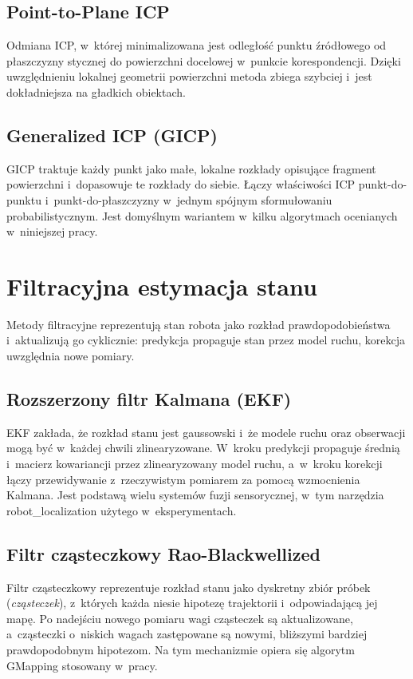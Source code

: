 \subsection{Point-to-Plane ICP}

Odmiana ICP, w~której minimalizowana jest odległość punktu źródłowego
od płaszczyzny stycznej do powierzchni docelowej w~punkcie korespondencji.
Dzięki uwzględnieniu lokalnej geometrii powierzchni metoda zbiega szybciej
i~jest dokładniejsza na gładkich obiektach.

\subsection{Generalized ICP (GICP)}

GICP traktuje każdy punkt jako małe, lokalne rozkłady opisujące fragment
powierzchni i~dopasowuje te rozkłady do siebie.
Łączy właściwości ICP punkt-do-punktu i~punkt-do-płaszczyzny w~jednym
spójnym sformułowaniu probabilistycznym.
Jest domyślnym wariantem w~kilku algorytmach ocenianych w~niniejszej pracy.

\section{Filtracyjna estymacja stanu}

Metody filtracyjne reprezentują stan robota jako rozkład prawdopodobieństwa
i~aktualizują go cyklicznie: predykcja propaguje stan przez model ruchu,
korekcja uwzględnia nowe pomiary.

\subsection{Rozszerzony filtr Kalmana (EKF)}

EKF zakłada, że rozkład stanu jest gaussowski i~że modele ruchu oraz obserwacji
mogą być w~każdej chwili zlinearyzowane.
W~kroku predykcji propaguje średnią i~macierz kowariancji przez zlinearyzowany
model ruchu, a~w~kroku korekcji łączy przewidywanie z~rzeczywistym pomiarem
za pomocą wzmocnienia Kalmana.
Jest podstawą wielu systemów fuzji sensorycznej, w~tym narzędzia robot\_localization
użytego w~eksperymentach.

\subsection{Filtr cząsteczkowy Rao-Blackwellized}

Filtr cząsteczkowy reprezentuje rozkład stanu jako dyskretny zbiór
próbek (\textit{cząsteczek}), z~których każda niesie hipotezę trajektorii
i~odpowiadającą jej mapę.
Po nadejściu nowego pomiaru wagi cząsteczek są aktualizowane, a~cząsteczki
o~niskich wagach zastępowane są nowymi, bliższymi bardziej prawdopodobnym
hipotezom.
Na tym mechanizmie opiera się algorytm GMapping stosowany w~pracy.

